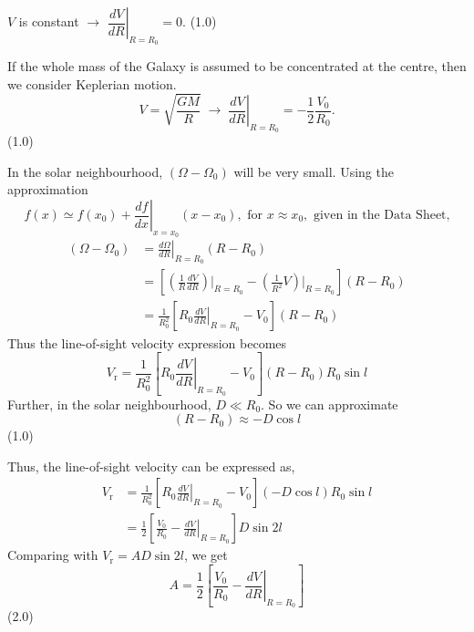 \begin{description}
\begin{description}
    $V$ is constant $\rightarrow$
    $\left.\dfrac{dV}{dR}\right|_{R=R_0} = 0$. \hfill(1.0)
  \item[(II)] If the whole mass of the Galaxy is assumed to be concentrated
    at the centre, then we consider Keplerian motion.
    \[
      V = \sqrt{\frac{GM}{R}}
      \;\rightarrow\;
      \left.\frac{dV}{dR}\right|_{R=R_0} = -\frac{1}{2}\frac{V_0}{R_0}.
    \]
    \hfill(1.0)
  \end{description}
\item[(T06.3b)] In the solar neighbourhood, $(\Omega - \Omega_0)$ will be
  very small. Using the approximation
  \[
    f(x) \simeq f(x_0)
      + \left.\frac{df}{dx}\right|_{x=x_0}(x - x_0),
    \text{ for } x \approx x_0, \text{ given in the Data Sheet,}
  \]
  \begin{align*}
    (\Omega - \Omega_0)
      &= \left.\frac{d\Omega}{dR}\right|_{R=R_0}(R - R_0)
       \tag*{(2.0)}\\
      &= \left[\left(\frac{1}{R}\frac{dV}{dR}\right)\bigg|_{R=R_0}
         - \left(\frac{1}{R^2}V\right)\bigg|_{R=R_0}\right](R - R_0)\\
      &= \frac{1}{R_0^2}\left[R_0\left.\frac{dV}{dR}\right|_{R=R_0}
         - V_0\right](R - R_0)
  \end{align*}
  Thus the line-of-sight velocity expression becomes
  \[
    V_{\mathrm{r}} = \frac{1}{R_0^2}
      \left[R_0\left.\frac{dV}{dR}\right|_{R=R_0} - V_0\right]
      (R - R_0)R_0\sin l
  \]
  Further, in the solar neighbourhood, $D \ll R_0$. So we can approximate
  \[
    (R - R_0) \approx -D\cos l
  \]
  \hfill(1.0)

  Thus, the line-of-sight velocity can be expressed as,
  \begin{align*}
    V_{\mathrm{r}}
      &= \frac{1}{R_0^2}
         \left[R_0\left.\frac{dV}{dR}\right|_{R=R_0} - V_0\right]
         (-D\cos l)R_0\sin l\\
      &= \frac{1}{2}
         \left[\frac{V_0}{R_0} - \left.\frac{dV}{dR}\right|_{R=R_0}\right]
         D\sin 2l
  \end{align*}
  Comparing with $V_{\mathrm{r}} = AD\sin 2l$, we get
  \[
    A = \frac{1}{2}
        \left[\frac{V_0}{R_0} - \left.\frac{dV}{dR}\right|_{R=R_0}\right]
  \]
  \hfill(2.0)


\end{description}
